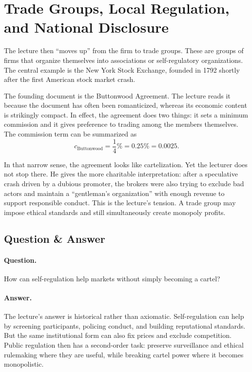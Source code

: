 \section{Trade Groups, Local Regulation, and National Disclosure}

The lecture then ``moves up'' from the firm to trade groups. These are groups of firms that organize themselves into associations or self-regulatory organizations. The central example is the New York Stock Exchange, founded in 1792 shortly after the first American stock market crash.

The founding document is the Buttonwood Agreement. The lecture reads it because the document has often been romanticized, whereas its economic content is strikingly compact. In effect, the agreement does two things: it sets a minimum commission and it gives preference to trading among the members themselves. The commission term can be summarized as
\begin{equation}
c_{\text{Buttonwood}}=\frac{1}{4}\%=0.25\%=0.0025.
\end{equation}

In that narrow sense, the agreement looks like cartelization. Yet the lecturer does not stop there. He gives the more charitable interpretation: after a speculative crash driven by a dubious promoter, the brokers were also trying to exclude bad actors and maintain a ``gentleman's organization'' with enough revenue to support responsible conduct. This is the lecture's tension. A trade group may impose ethical standards and still simultaneously create monopoly profits.

\subsection{Question \& Answer}

\paragraph{Question.} How can self-regulation help markets without simply becoming a cartel?

\paragraph{Answer.} The lecture's answer is historical rather than axiomatic. Self-regulation can help by screening participants, policing conduct, and building reputational standards. But the same institutional form can also fix prices and exclude competition. Public regulation then has a second-order task: preserve surveillance and ethical rulemaking where they are useful, while breaking cartel power where it becomes monopolistic.

